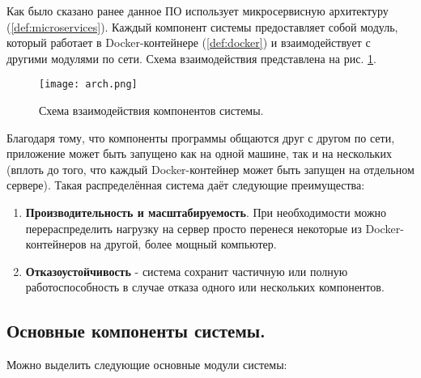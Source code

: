 Как было сказано ранее данное ПО использует микросервисную архитектуру (\ref{def:microservices}). Каждый компонент системы
предоставляет собой модуль, который работает в Docker-контейнере (\ref{def:docker}) и взаимодействует с другими модулями
по сети. Схема взаимодействия представлена на рис. \ref{fig:arch}.

\begin{figure}[h]
    \centering
    \texttt{[image: arch.png]}
    \caption{Схема взаимодействия компонентов системы.}
    \label{fig:arch}
\end{figure}

\noindent Благодаря тому, что компоненты программы общаются друг с другом по сети, приложение может быть запущено как
на одной машине, так и на нескольких (вплоть до того, что каждый Docker-контейнер может быть запущен на отдельном сервере).
Такая распределённая система даёт следующие преимущества:
\begin{enumerate}
    \item \textbf{Производительность и масштабируемость}. При необходимости можно перераспределить нагрузку на сервер
    просто перенеся некоторые из Docker-контейнеров на другой, более мощный компьютер.
    \item \textbf{Отказоустойчивость} - система сохранит частичную или полную работоспособность в случае отказа одного
    или нескольких компонентов.
\end{enumerate}

\subsection{Основные компоненты системы.}

Можно выделить следующие основные модули системы:


